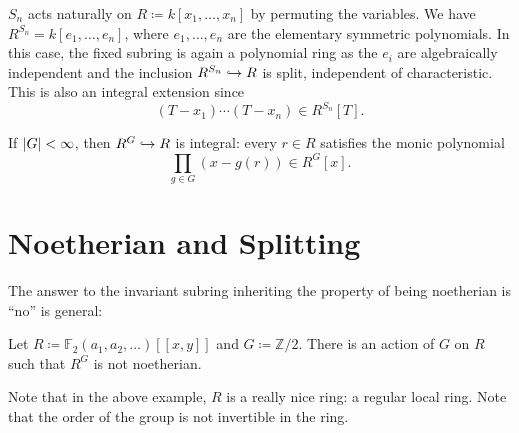 \documentclass[12pt]{article}
\begin{document}
\begin{ex} \label{ex:symmetric-group-action} \phantom{h} \newline
	$S_{n}$ acts naturally on $R \coloneqq k[x_{1}, \ldots, x_{n}]$ by permuting the variables. \newline
	We have $R^{S_{n}} = k[e_{1}, \ldots, e_{n}]$, where $e_{1}, \ldots, e_{n}$ are the elementary symmetric polynomials. \newline
	In this case, the fixed subring is again a polynomial ring as the $e_{i}$ are algebraically independent and the inclusion $R^{S_{n}} \hookrightarrow R$ is split\footnotemark, independent of characteristic. \newline
	This is also an integral extension since 
	\begin{equation*} 
		(T - x_{1}) \cdots (T - x_{n}) \in R^{S_{n}}[T].
	\end{equation*}
\end{ex}

\begin{obs}
	If ${\left\lvert G \right\lvert} < \infty$, then $R^{G} \hookrightarrow R$ is integral: every $r \in R$ satisfies the monic polynomial 
	\begin{equation*} 
		\prod_{g \in G} (x - g(r)) \in R^{G}[x].
	\end{equation*}
\end{obs}

\section{Noetherian and Splitting}

The answer to the invariant subring inheriting the property of being noetherian is ``no'' is general:

\begin{ex} \label{ex:nagarajan}
	Let $R \coloneqq \mathbb{F}_{2}(a_{1}, a_{2}, \ldots)[\![x, y]\!]$ and $G \coloneqq \mathbb{Z}/2$. There is an action of $G$ on $R$ such that $R^{G}$ is not noetherian.
\end{ex}
Note that in the above example, $R$ is a really nice ring: a regular local ring. Note that the order of the group is not invertible in the ring.
\end{document}
